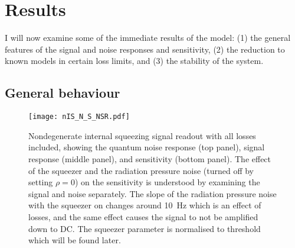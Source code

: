 \section{Results}
\label{sec:nIS_sigRO_results}


I will now examine some of the immediate results of the model: (1) the general features of the signal and noise responses and sensitivity, (2) the reduction to known models in certain loss limits, and (3) the stability of the system.

\subsection{General behaviour}
\label{sec:nIS_general_behaviour}

\begin{figure}
	\centering
	\texttt{[image: nIS\_N\_S\_NSR.pdf]}
	\caption{  Nondegenerate internal squeezing signal readout with all losses included, showing the quantum noise response (top panel), signal response (middle panel), and sensitivity (bottom panel). The effect of the squeezer and the radiation pressure noise (turned off by setting $\rho=0$) on the sensitivity is understood by examining the signal and noise separately. The slope of the radiation pressure noise with the squeezer on changes around 10~Hz which is an effect of losses, and the same effect causes the signal to not be amplified down to DC. The squeezer parameter is normalised to threshold which will be found later.}
	\label{fig:nIS_general_sens}
\end{figure}


